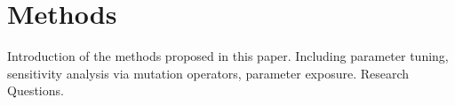 \section{Methods}
Introduction of the methods proposed in this paper. Including parameter tuning, sensitivity analysis via mutation operators, parameter exposure. Research Questions.